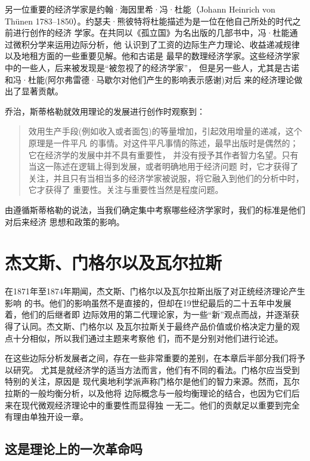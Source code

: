 另一位重要的经济学家是约翰·海因里希·冯·杜能（Johann Heinrich von Thünen
1783--1850）。约瑟夫·熊彼特将杜能描述为是一位在他自己所处的时代之前进行创作的经济
学家。在共同以《孤立国》为名出版的几部书中，冯·杜能通过微积分学来运用边际分析，他
认识到了工资的边际生产力理论、收益递减规律以及地租方面的一些重要见解。他和古诺是
最早的数理经济学家。这些经济学家中的一些人，后来被发现是“被忽视了的经济学家”，
但是另一些人，尤其是古诺和冯·杜能(阿尔弗雷德·马歇尔对他们产生的影响表示感谢)对后
来的经济理论做出了显著贡献。

乔治，斯蒂格勒就效用理论的发展进行创作时观察到：

\begin{quotation}
  效用生产手段(例如收入或者面包)的等量增加，引起效用增量的递减，这个原理是一件平凡
  的事情。对这件平凡事情的陈述，最早出版时是偶然的；它在经济学的发展中并不具有重要性，
  并没有授予其作者智力名望。只有当这一陈述在逻辑上得到发展，或者明确地用于经济问题
  时，它才获得了关注，并且只有当相当多的经济学家被说服，将它融入到他们的分析中时，它才获得了
  重要性。关注与重要性当然是程度问题。
\end{quotation}

由遵循斯蒂格勒的说法，当我们确定集中考察哪些经济学家时，我们的标准是他们对后来经济
思想和政策的影响。

\section{杰文斯、门格尔以及瓦尔拉斯}

在1871年至1874年期闻，杰文斯、门格尔以及瓦尔拉斯出版了对正统经济理论产生影响
的书。他们的影响虽然不是直接的，但却在19世纪最后的二十五年中发展着，他们的后继者即
边际效用的第二代理论家，为一些“新”观点而战，并逐渐获得了认同。杰文斯、门格尔以
及瓦尔拉斯关于最终产品价值或价格决定力量的观点十分相似，所以我们通过主题来考察他
们，而不是分别对他们进行论述。

在这些边际分析发展者之间，存在一些非常重要的差别，在本章后半部分我们将予以研究。
尤其是就经济学的适当方法而言，他们有不同的看法。门格尔应当受到特别的关注，原因是
现代奥地利学派声称门格尔是他们的智力来源。然而，瓦尔拉斯的一般均衡分析，以及他将
边际概念与一般均衡理论的结合，也因为它们后来在现代微观经济理论中的重要性而显得独
一无二。他们的贡献足以重要到完全有理由单独开设一章。

\subsection{这是理论上的一次革命吗}

